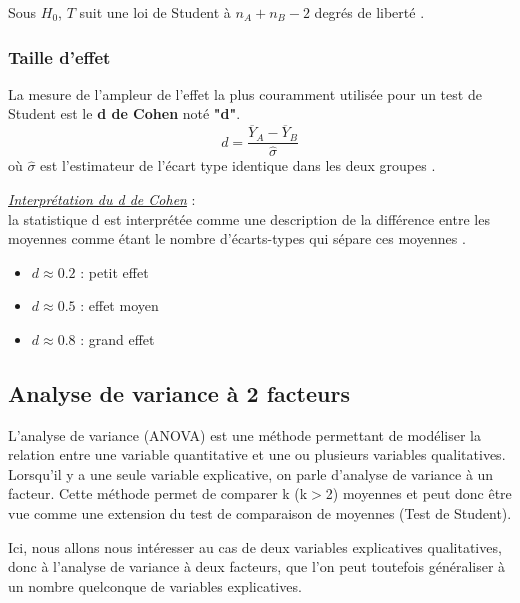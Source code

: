 \documentclass[12pt,a4paper]{article}
\begin{document}
	\noindent
	Sous \( H_0 \), \( T \) suit une loi de Student à \( n_A + n_B - 2 \) degrés de liberté \cite{poulin2023}.
	
	\subsubsection{Taille d'effet}
	\begin{mdframed}[backgroundcolor=gray!20, hidealllines=true, innermargin=10pt, outermargin=10pt, skipabove=10pt, skipbelow=10pt, nobreak=true]
			La mesure de l'ampleur de l'effet la plus couramment utilisée pour un test de Student est le \textbf{d de Cohen} noté \textbf{"d"}.
		\begin{equation}
			d = \frac{\overline{Y}_A-\overline{Y}_B}{\hat{\sigma}} 
		\end{equation} 
		où $\hat{\sigma}$ est l'estimateur de l'écart type identique dans les deux groupes \cite{navarro2021}.\\
	\end{mdframed}
	
	\noindent
	\textit{\underline{Interprétation du d de Cohen}} : \\
	
	la statistique d est interprétée comme une description de la différence entre les moyennes comme étant le nombre d'écarts-types qui sépare ces moyennes \cite{navarro2021}.
	\begin{itemize}[label=$\bullet$]
		\item $d \approx 0.2$ : petit effet
		\item $d \approx 0.5$ : effet moyen
		\item $d \approx 0.8$ : grand effet
	\end{itemize}
	
	\subsection{Analyse de variance à 2 facteurs}
	L'analyse de variance (ANOVA) est une méthode permettant de modéliser la relation entre une variable quantitative et une ou plusieurs variables qualitatives. Lorsqu'il y a une seule variable explicative, on parle d'analyse de variance à un facteur. Cette méthode permet de comparer k (k$>$2) moyennes et peut donc être vue comme une extension du test de comparaison de moyennes (Test de Student).
	
	Ici, nous allons nous intéresser au cas de deux variables explicatives qualitatives, donc à l'analyse de variance à deux facteurs, que l'on peut toutefois généraliser à un nombre quelconque de variables explicatives.
	
\end{document}
